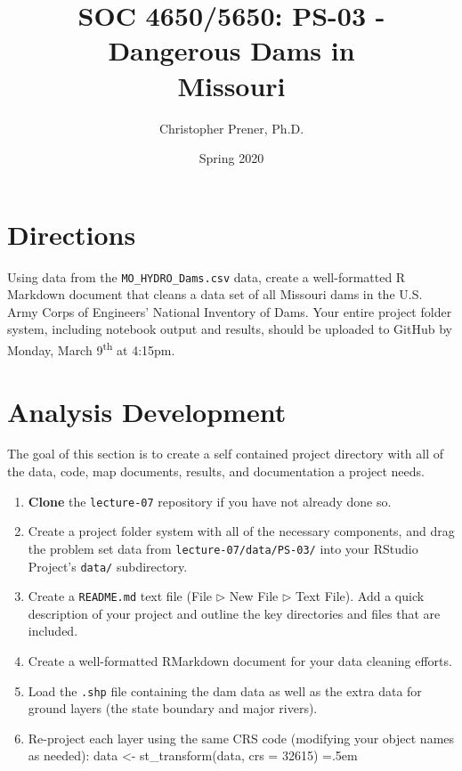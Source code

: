 \documentclass{tufte-handout}
\title{SOC 4650/5650: PS-03 - Dangerous Dams in \\Missouri}
\author{Christopher Prener, Ph.D.}
\date{Spring 2020}
\newenvironment{codeBlock}
 {\SaveVerbatim{cverb}}
 {\endSaveVerbatim
  \flushleft\fboxrule=0pt\fboxsep=.5em
  \colorbox{cverbbg}{%
    \makebox[\dimexpr\linewidth-2\fboxsep][l]{\BUseVerbatim{cverb}}%
  }
  \endflushleft
}
\begin{document}
\maketitle %

\vspace{5mm}
\section{Directions}
Using data from the \texttt{MO\_HYDRO\_Dams.csv} data, create a well-formatted R Markdown document that cleans a data set of all Missouri dams in the U.S. Army Corps of Engineers' National Inventory of Dams. Your entire project folder system, including notebook output and results, should be uploaded to GitHub by Monday, March 9\textsuperscript{th} at 4:15pm.

\vspace{5mm}
\section{Analysis Development}
The goal of this section is to create a self contained project directory with all of the data, code, map documents, results, and documentation a project needs.

\begin{enumerate}[label=\alph*.]
\item \textbf{Clone} the \texttt{lecture-07} repository if you have not already done so.
\item Create a project folder system with all of the necessary components, and drag the problem set data from \texttt{lecture-07/data/PS-03/} into your RStudio Project's \texttt{data/} subdirectory.
\item Create a \texttt{README.md} text file (\textsf{File $\triangleright$} {\color{red}\textsf{New File}} \textsf{$\triangleright$ Text File}). Add a quick description of your project and outline the key directories and files that are included. 
\item Create a well-formatted RMarkdown document for your data cleaning efforts.
\item Load the \texttt{.shp} file containing the dam data as well as the extra data for ground layers (the state boundary and major rivers).
\item Re-project each layer using the same CRS code (modifying your object names as needed):
\begin{codeBlock}
data <- st_transform(data, crs = 32615)
\end{codeBlock}
\end{enumerate}
\end{document}
